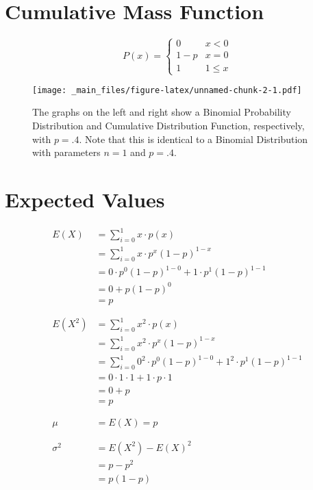 \documentclass[]{book}
\begin{document}
\section{Cumulative Mass Function}\label{cumulative-mass-function}

\label{Bernoulli1} \[P(x)=\left\{
        \begin{array}{lll}
            0   & x<0\\
            1-p & x=0\\
            1   & 1\leq x
        \end{array}
    \right. \]

\begin{figure}[htbp]
\centering
\texttt{[image: \_main\_files/figure-latex/unnamed-chunk-2-1.pdf]}
\caption{\label{fig:unnamed-chunk-2}The graphs on the left and right show a
Binomial Probability Distribution and Cumulative Distribution Function,
respectively, with \(p=.4\). Note that this is identical to a Binomial
Distribution with parameters \(n=1\) and \(p=.4\).}
\end{figure}

\section{Expected Values}\label{expected-values}

\[ 
\begin{align*}
E(X) 
  &= \sum\limits_{i=0}^{1} x\cdot p(x) \\
    &= \sum\limits_{i=0}^{1} x \cdot p^{x} (1-p)^{1-x}\\
  &= 0 \cdot p^{0} (1-p)^{1-0} + 1 \cdot p^{1} (1-p)^{1-1}\\
  &= 0 + p (1-p)^{0}\\
    &= p\\
    \\
    \\
E(X^{2}) 
  &= \sum\limits_{i=0}^{1} x^2 \cdot p(x)\\
  &= \sum\limits_{i=0}^{1} x^{2} \cdot p^x (1-p)^{1-x}\\
  &= \sum\limits_{i=0}^{1} 0^{2} \cdot p^0 (1-p)^{1-0} + 1^2 \cdot p^1 (1-p)^{1-1}\\
  &= 0 \cdot 1 \cdot 1 + 1 \cdot p \cdot 1 \\
    &= 0 + p\\
    &= p\\
    \\
    \\
\mu &= E(X) = p\\
  \\
  \\
\sigma^2 
  &= E(X^2) - E(X)^2 \\
  &= p-p^2 \\
  &= p(1-p)
\end{align*}
\]
\end{document}
